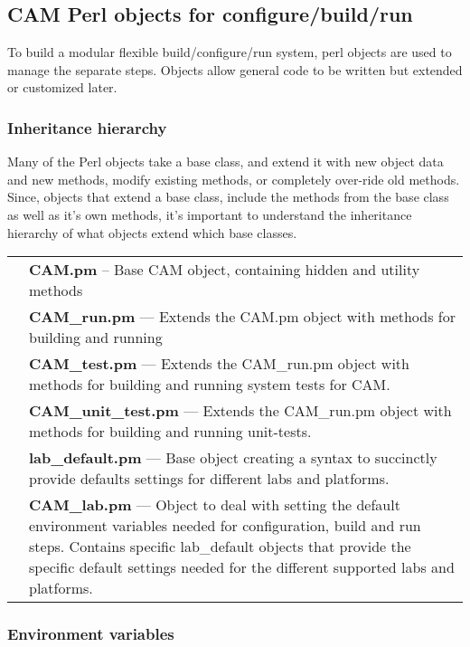 \documentclass[]{article}
\begin{document}
\subsection{CAM Perl objects for configure/build/run}

To build a modular flexible build/configure/run system, perl objects are
used to manage the separate steps. Objects allow general code to be written
but extended or customized later.

\subsubsection{Inheritance hierarchy}

Many of the Perl objects take a base class, and extend it with new object
data and new methods, modify existing methods, or completely over-ride old
methods. Since, objects that extend a base class, include the methods from
the base class as well as it's own methods, it's important to understand
the inheritance hierarchy of what objects extend which base classes.\\
\begin{tabular}{r p{3.7in}}
& {\bf CAM.pm} -- Base CAM object, containing hidden and
utility methods \\
& {\bf CAM\_run.pm} --- Extends the CAM.pm object with methods
for building and running \\
& {\bf CAM\_test.pm} --- Extends the CAM\_run.pm object with methods
for building and running system tests for CAM.\\
& {\bf CAM\_unit\_test.pm} --- Extends the CAM\_run.pm object with methods
for building and running unit-tests.\\
& {\bf lab\_default.pm} --- Base object creating a syntax to
succinctly provide defaults settings for different labs
and platforms. \\
& {\bf CAM\_lab.pm} --- Object to deal with setting the default environment 
                  variables needed for configuration, build and run steps. 
                  Contains specific lab\_default objects that provide the
                  specific default settings needed for the different supported
                  labs and platforms.
\end{tabular}

\subsubsection{Environment variables}
\end{document}
